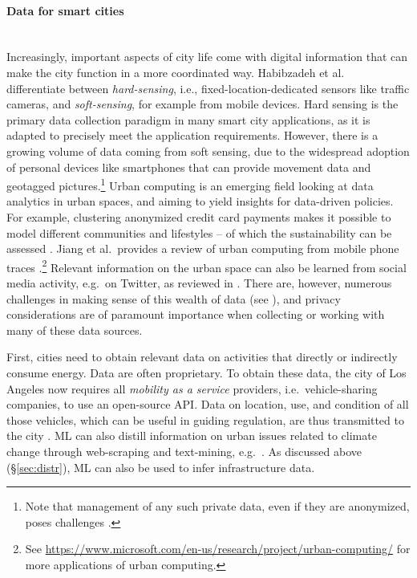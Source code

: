 \documentclass[11pt]{report}
\newcommand{\et}{et al.~}
\newcommand{\Gap}{\texorpdfstring{\hfill}{}}
\newcommand{\Rec}{\texorpdfstring{{\small\emph{\color{blue}{\fbox{High Leverage}}}}}{}}
\begin{document}
\paragraph{Data for smart cities}\Gap\Rec\mbox{}\\
\label{sec:data_pol}Increasingly, important aspects of city life come with digital information that can make the city function in a more coordinated way. Habibzadeh \et \cite{8291118} differentiate between \emph{hard-sensing}, i.e., fixed-location-dedicated sensors like traffic cameras, and \emph{soft-sensing}, for example from mobile devices. Hard sensing is the primary data collection paradigm in many smart city applications, as it is adapted to precisely meet the application requirements. However, there is a growing volume of data coming from soft sensing, due to the widespread adoption of personal devices like smartphones that can provide movement data and geotagged pictures.\footnote{Note that management of any such private data, even if they are anonymized, poses challenges \cite{creutzig_leveraging_2019}.} Urban computing \cite{urban-computing} is an emerging field looking at data analytics in urban spaces, and aiming to yield insights for data-driven policies. For example, clustering anonymized credit card payments makes it possible to model different communities and lifestyles -- of which the sustainability can be assessed \cite{di2018sequences}. Jiang \et provides a review of urban computing from mobile phone traces \cite{jiang2013review}.\footnote{See \url{https://www.microsoft.com/en-us/research/project/urban-computing/} for more applications of urban computing.} Relevant information on the urban space can also be learned from social media activity, e.g.~on Twitter, as reviewed in \cite{ilieva2018social, ruths2014social}.
There are, however, numerous challenges in making sense of this wealth of data (see \cite{mosannenzadeh2017identifying}), and privacy considerations are of paramount importance when collecting or working with many of these data sources.

First, cities need to obtain relevant data on activities that directly or indirectly consume energy. Data are often proprietary. To obtain these data, the city of Los Angeles now requires all \emph{mobility as a service} providers, i.e.~vehicle-sharing companies, to use an open-source API. Data on location, use, and condition of all those vehicles, which can be useful in guiding regulation, are thus transmitted to the city \cite{cityLAgit}. ML can also distill information on urban issues related to climate change through web-scraping and text-mining, e.g.~\cite{doi:10.1177/0361198119838982}. As discussed above (\S\ref{sec:distr}), ML can also be used to infer infrastructure data.
\end{document}
